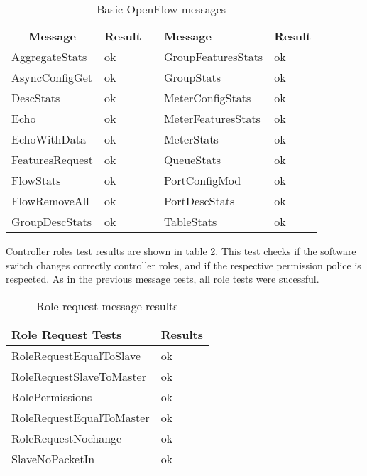 \begin{table}[h]
\centering
\caption{Basic OpenFlow messages}
\label{tab:oftestbasic}
\begin{tabular}{|l|l|l|l|l|}
\cline{1-2} \cline{4-5}
\multicolumn{1}{|c|}{\textbf{Message}} & \textbf{Result} &  & \textbf{Message}   & \textbf{Result} \\ \cline{1-2} \cline{4-5} 
AggregateStats                         & ok              &  & GroupFeaturesStats & ok              \\ \cline{1-2} \cline{4-5} 
AsyncConfigGet                         & ok              &  & GroupStats         & ok              \\ \cline{1-2} \cline{4-5} 
DescStats                              & ok              &  & MeterConfigStats   & ok              \\ \cline{1-2} \cline{4-5} 
Echo                                   & ok              &  & MeterFeaturesStats & ok              \\ \cline{1-2} \cline{4-5} 
EchoWithData                           & ok              &  & MeterStats         & ok              \\ \cline{1-2} \cline{4-5} 
FeaturesRequest                        & ok              &  & QueueStats         & ok              \\ \cline{1-2} \cline{4-5} 
FlowStats                              & ok              &  & PortConfigMod      & ok              \\ \cline{1-2} \cline{4-5} 
FlowRemoveAll                          & ok              &  & PortDescStats      & ok              \\ \cline{1-2} \cline{4-5} 
GroupDescStats                         & ok              &  & TableStats         & ok              \\ \cline{1-2} \cline{4-5} 
\end{tabular}
\end{table}

Controller roles test results are shown in table \ref{tab:oftestrole}. This test checks if the software switch changes correctly controller roles, and if the respective permission police is respected. As in the previous message tests, all role tests were sucessful.    

\begin{table}[h]
\centering
\caption{Role request message results}
\label{tab:oftestrole}
\begin{tabular}{|l|l|}
\hline
\textbf{Role Request Tests} & \textbf{Results} \\ \hline
RoleRequestEqualToSlave     & ok               \\ \hline
RoleRequestSlaveToMaster    & ok               \\ \hline
RolePermissions             & ok               \\ \hline
RoleRequestEqualToMaster    & ok               \\ \hline
RoleRequestNochange         & ok               \\ \hline
SlaveNoPacketIn             & ok               \\ \hline
\end{tabular}
\end{table}

